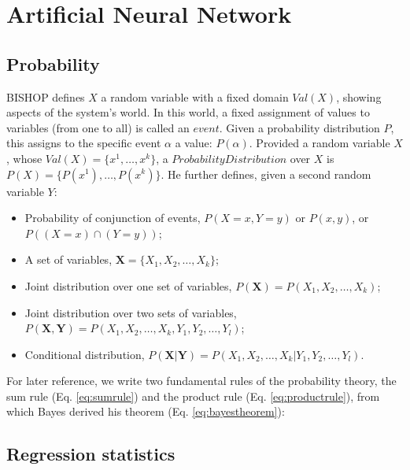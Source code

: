 
\chapter{Artificial Neural Network}
\label{cap:ann}

\section{Probability}
\label{sec:probability}

BISHOP defines $X$ a random variable with a fixed domain $Val(X)$,
showing aspects of the system's world. In this world, a fixed assignment of
values to variables (from one to all) is called an $event$.
Given a probability distribution $P$, this assigns to the specific event
$\alpha$ a value: $P(\alpha)$.
Provided a random variable $X$, whose $Val(X) = \{ x^1, \ldots , x^k \}$, a
$Probability Distribution$ over $X$ is $P(X) = \{ P(x^1), \ldots , P(x^k) \}$.
He further defines, given a second random variable $Y$:
\begin{itemize}
  \item {Probability of conjunction of events, $P(X = x, Y = y)$ or $P(x, y)$,
  or $P((X = x) \cap (Y = y))$;}
  \item {A set of variables, $\mathbf{X} = \{X_1, X_2, \ldots , X_k \}$;}
  \item {Joint distribution over one set of variables, $P(\mathbf{X}) =
  P(X_1, X_2, \ldots , X_k) $;}
  \item {Joint distribution over two sets of variables, $P(\mathbf{X, Y}) =
  P(X_1, X_2, \ldots , X_k, Y_1, Y_2, \ldots , Y_l  ) $;}
  \item {Conditional distribution, $P(\mathbf{X | Y}) =
  P(X_1, X_2, \ldots , X_k | Y_1, Y_2, \ldots , Y_l  ) $.}
\end{itemize}

For later reference, we write two fundamental rules of the probability theory,
the sum rule (Eq. \ref{eq:sumrule}) and the product rule (Eq.
\ref{eq:productrule}), from which Bayes derived his theorem (Eq.
\ref{eq:bayestheorem}):




\section{Regression statistics}
\label{sec:regressionstatistics}

